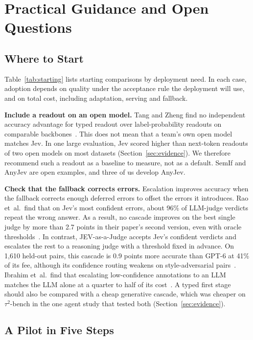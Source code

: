 \section{Practical Guidance and Open Questions}
\label{sec:guidance}

\subsection{Where to Start}


Table~\ref{tab:starting} lists starting comparisons by deployment need. In each case, adoption depends on quality under the acceptance rule the deployment will use, and on total cost, including adaptation, serving and fallback.

\noindent\textbf{Include a readout on an open model.} Tang and Zheng find no independent accuracy advantage for typed readout over label-probability readouts on comparable backbones~\cite{tang2026typed}. This does not mean that a team's own open model matches Jev. In one large evaluation, Jev scored higher than next-token readouts of two open models on most datasets (Section~\ref{sec:evidence}). We therefore recommend such a readout as a baseline to measure, not as a default. SemIf and AnyJev are open examples, and three of us develop AnyJev.

\noindent\textbf{Check that the fallback corrects errors.} Escalation improves accuracy when the fallback corrects enough deferred errors to offset the errors it introduces. Rao et~al.\ find that on Jev's most confident errors, about 96\% of LLM-judge verdicts repeat the wrong answer. As a result, no cascade improves on the best single judge by more than 2.7 points in their paper's second version, even with oracle thresholds~\cite{rao2026jev}. In contrast, JEV-as-a-Judge accepts Jev's confident verdicts and escalates the rest to a reasoning judge with a threshold fixed in advance. On 1{,}610 held-out pairs, this cascade is 0.9 points more accurate than GPT-6 at 41\% of its fee, although its confidence routing weakens on style-adversarial pairs~\cite{li2026jev}. Ibrahim et~al.\ find that escalating low-confidence annotations to an LLM matches the LLM alone at a quarter to half of its cost~\cite{ibrahim2026evaluating}. A typed first stage should also be compared with a cheap generative cascade, which was cheaper on $\tau^2$-bench in the one agent study that tested both (Section~\ref{sec:evidence}).

\subsection{A Pilot in Five Steps}
\label{sec:pilot}

